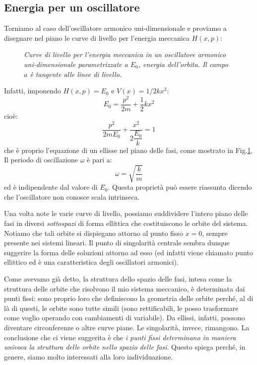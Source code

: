 \documentclass[a4paper,openany]{article}
\begin{document}
	\subsection{Energia per un oscillatore}
	Torniamo al caso dell'oscillatore armonico uni-dimensionale e proviamo a disegnare nel piano le curve di livello per l'energia meccanica $H(x,p)$:
	\begin{figure}[H]
		\centering
		\caption{\textit{Curve di livello per l'energia meccanica in un oscillatore armonico uni-dimensionale parametrizzate a $E_0$, energia dell'orbita. Il campo $a$ è tangente alle linee di livello.}}
		\label{FigOscill}
	\end{figure}
	Infatti, imponendo $H(x,p) = E_{0}$ e $V(x) = 1/2kx^{2}$:
	$$
	E_{0} = \dfrac{p^{2}}{2m} + \dfrac{1}{2}kx^{2}
	$$
	cioè:
	\begin{equation}
		\dfrac{p^{2}}{2mE_{0}} + \dfrac{x^{2}}{2\dfrac{E_{0}}{k}} = 1
	\end{equation}
	che è proprio l'equazione di un ellisse nel piano delle fasi, come mostrato in Fig.\ref{FigOscill}.
	Il periodo di oscillazione $\omega$ è pari a:
	$$
	\omega = \sqrt{\dfrac{k}{m}} 
	$$ 
	ed è indipendente dal valore di $E_{0}$. Questa proprietà può essere riassunta dicendo che l'oscillatore non conosce scala intrinseca.
	
	
	Una volta note le varie curve di livello, possiamo suddividere l'intero piano delle fasi in diversi \textit{sottospazi} di forma ellittica che costituiscono le orbite del sistema. Notiamo che tali orbite si dispiegano attorno al punto fisso $x=0$, sempre presente nei sistemi lineari. Il punto di singolarità centrale sembra dunque suggerire la forma delle soluzioni attorno ad esso (ed infatti viene chiamato punto ellittico ed è una caratteristica degli oscillatori armonici).
	
	Come avevamo già detto, la struttura dello spazio delle fasi, intesa come la struttura delle orbite che risolvono il mio sistema meccanico, è determinata dai punti fissi: sono proprio loro che definiscono la geometria delle orbite perché, al di là di questi, le orbite sono tutte simili (sono rettificabili, le posso trasformare come voglio operando con cambiamenti di variabile). Da ellissi, infatti, possono diventare circonferenze o altre curve piane. Le singolarità, invece, rimangono. La conclusione che ci viene suggerita è che \textit{i punti fissi determinano in maniera univoca la struttura delle orbite nello spazio delle fasi}. Questo spiega perché, in genere, siamo molto interessati alla loro individuazione.
	\newpage
\end{document}

